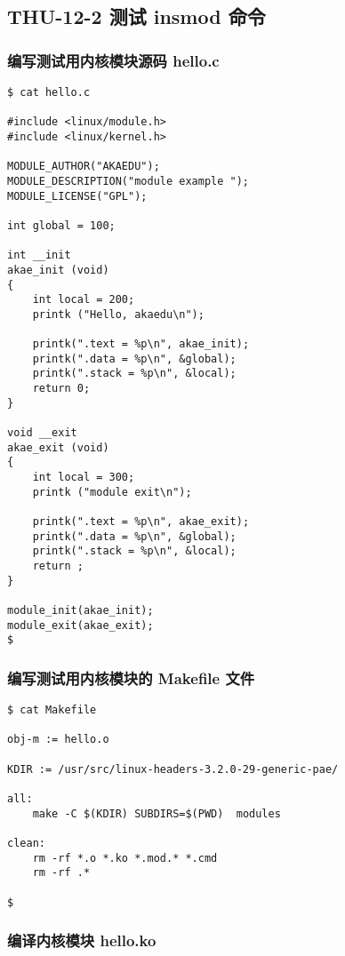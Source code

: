 \documentclass[11pt,a4paper]{article}
\begin{document}
\subsection{THU-12-2 测试 insmod 命令}

\subsubsection{编写测试用内核模块源码 hello.c}

{\begin{shaded}\begin{verbatim}
$ cat hello.c 

#include <linux/module.h>
#include <linux/kernel.h>

MODULE_AUTHOR("AKAEDU");
MODULE_DESCRIPTION("module example ");
MODULE_LICENSE("GPL");

int global = 100;

int __init 
akae_init (void)
{
    int local = 200;
    printk ("Hello, akaedu\n");

    printk(".text = %p\n", akae_init);
    printk(".data = %p\n", &global);
    printk(".stack = %p\n", &local);
    return 0;
}

void __exit
akae_exit (void)
{
    int local = 300;
    printk ("module exit\n");

    printk(".text = %p\n", akae_exit);
    printk(".data = %p\n", &global);
    printk(".stack = %p\n", &local);
    return ;
}

module_init(akae_init);
module_exit(akae_exit);
$ 
\end{verbatim}\end{shaded}}
\subsubsection{编写测试用内核模块的 Makefile 文件}

{\begin{shaded}\begin{verbatim}
$ cat Makefile 

obj-m := hello.o

KDIR := /usr/src/linux-headers-3.2.0-29-generic-pae/

all:
    make -C $(KDIR) SUBDIRS=$(PWD)  modules

clean:
    rm -rf *.o *.ko *.mod.* *.cmd 
    rm -rf .*

$ 
\end{verbatim}\end{shaded}}
\subsubsection{编译内核模块 hello.ko}
\end{document}
